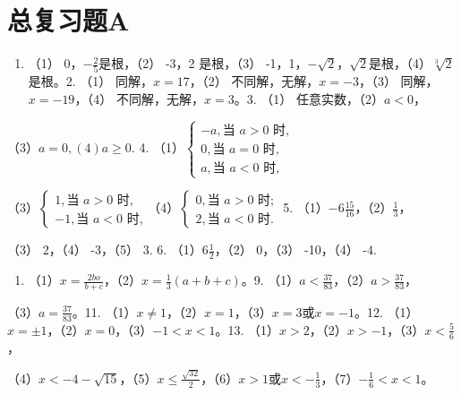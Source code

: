 \section{总复习题A}

\begin{enumerate}
\item
  （1） 0，\(-\frac{2}{5}\)是根，（2） -3，2 是根，（3）
  -1，1，\(-\sqrt{2}\)，\(\sqrt{2}\)是根，（4）\(\sqrt[3]{2}\)是根。2.
  （1） 同解，\(x = 17\)，（2） 不同解，无解，\(x = -3\)，（3）
  同解，\(x = -19\)，（4） 不同解，无解，\(x = 3\)。3. （1）
  任意实数，（2）\(a < 0\)，
\end{enumerate}

（3）\(a = 0, (4)a \geqslant 0.\) 4.
（1）\(\left\{ \begin{array}{l} -a, \text{当 } a > 0 \text{ 时,} \\ 0, \text{当 } a = 0 \text{ 时,} \\ a, \text{当 } a < 0 \text{ 时,} \end{array} \right.\)

（3）\(\left\{ \begin{array}{l} 1, \text{当 } a > 0 \text{ 时,} \\ -1, \text{当 } a < 0 \text{ 时,} \end{array} \right.\)（4）\(\left\{ \begin{array}{l} 0, \text{当 } a > 0 \text{ 时;} \\ 2, \text{当 } a < 0 \text{ 时.} \end{array} \right.\)
5. （1）\(-6\frac{15}{16}\)，（2）\(\frac{1}{3}\)，

（3） 2，（4） -3，（5） 3. 6. （1）\(6\frac{1}{2}\)，（2） 0，（3）
-10，（4） -4.

\begin{enumerate}[start=7]
\item
  （1）\(x = \frac{2bo}{b + c}\)，（2）\(x = \frac{1}{3}(a + b + c)\)。9.
  （1）\(a < \frac{37}{83}\)，（2）\(a > \frac{37}{83}\)，
\end{enumerate}

（3）\(a = \frac{37}{83}\)。11.
（1）\(x \neq 1\)，（2）\(x = 1\)，（3）\(x = 3\)或\(x = -1\)。12.
（1）\(x = \pm 1\)，（2）\(x = 0\)，（3）\(-1 < x < 1\)。13.
（1）\(x > 2\)，（2）\(x > -1\)，（3）\(x < \frac{5}{6}\)，

（4）\(x < -4 - \sqrt{15}\)，（5）\(x \leqslant \frac{\sqrt{32}}{2}\)，（6）\(x > 1\)或\(x < -\frac{1}{3}\)，（7）\(-\frac{1}{6} < x < 1\)。

